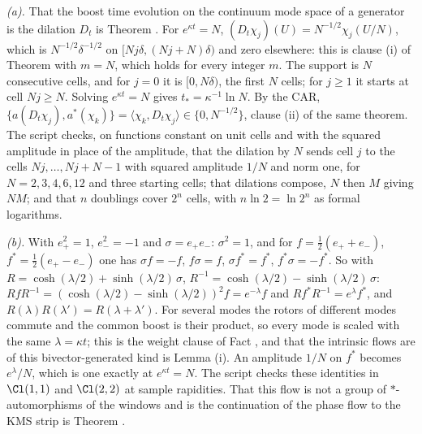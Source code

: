 \emph{(a).} That the boost time evolution on the continuum mode space of a generator is the dilation $D_{t}$ is Theorem . For $e^{\kappa t} = N$, $(D_{t}\chi_{j})(U) = N^{-1/2}\chi_{j}(U/N)$, which is $N^{-1/2}\delta^{-1/2}$ on $[Nj\delta, (Nj + N)\delta)$ and zero elsewhere: this is clause (i) of Theorem  with $m = N$, which holds for every integer $m$. The support is $N$ consecutive cells, and for $j = 0$ it is $[0, N\delta)$, the first $N$ cells; for $j \ge 1$ it starts at cell $Nj \ge N$. Solving $e^{\kappa t} = N$ gives $t_{*} = \kappa^{-1}\ln N$. By the CAR, $\{a(D_{t}\chi_{j}), a^{*}(\chi_{k})\} = \langle\chi_{k}, D_{t}\chi_{j}\rangle \in \{0, N^{-1/2}\}$, clause (ii) of the same theorem. The script checks, on functions constant on unit cells and with the squared amplitude in place of the amplitude, that the dilation by $N$ sends cell $j$ to the cells $Nj, \dots, Nj + N - 1$ with squared amplitude $1/N$ and norm one, for $N = 2, 3, 4, 6, 12$ and three starting cells; that dilations compose, $N$ then $M$ giving $NM$; and that $n$ doublings cover $2^{n}$ cells, with $n\ln 2 = \ln 2^{n}$ as formal logarithms.

\emph{(b).} With $e_{+}^{2} = 1$, $e_{-}^{2} = -1$ and $\sigma = e_{+}e_{-}$: $\sigma^{2} = 1$, and for $f = \tfrac12(e_{+} + e_{-})$, $f^{*} = \tfrac12(e_{+} - e_{-})$ one has $\sigma f = -f$, $f\sigma = f$, $\sigma f^{*} = f^{*}$, $f^{*}\sigma = -f^{*}$. So with $R = \cosh(\lambda/2) + \sinh(\lambda/2)\,\sigma$, $R^{-1} = \cosh(\lambda/2) - \sinh(\lambda/2)\,\sigma$: $RfR^{-1} = (\cosh(\lambda/2) - \sinh(\lambda/2))^{2}f = e^{-\lambda}f$ and $Rf^{*}R^{-1} = e^{\lambda}f^{*}$, and $R(\lambda)R(\lambda') = R(\lambda + \lambda')$. For several modes the rotors of different modes commute and the common boost is their product, so every mode is scaled with the same $\lambda = \kappa t$; this is the weight clause of Fact , and that the intrinsic flows are of this bivector-generated kind is Lemma (i). An amplitude $1/N$ on $f^{*}$ becomes $e^{\lambda}/N$, which is one exactly at $e^{\kappa t} = N$. The script checks these identities in $\Cl(1,1)$ and $\Cl(2,2)$ at sample rapidities. That this flow is not a group of $*$-automorphisms of the windows and is the continuation of the phase flow to the KMS strip is Theorem .

